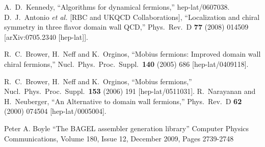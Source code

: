 \documentclass[letter,10pt]{report}
\begin{document}
\begin{thebibliography}{99}
  A.~D.~Kennedy,
  ``Algorithms for dynamical fermions,''
  hep-lat/0607038.
  D.~J.~Antonio {\it et al.}  [RBC and UKQCD Collaborations],
  ``Localization and chiral symmetry in three flavor domain wall QCD,''
  Phys.\ Rev.\ D {\bf 77} (2008) 014509
  [arXiv:0705.2340 [hep-lat]].

  R.~C.~Brower, H.~Neff and K.~Orginos,
  ``Mobius fermions: Improved domain wall chiral fermions,''
  Nucl.\ Phys.\ Proc.\ Suppl.\  {\bf 140} (2005) 686
  [hep-lat/0409118].

  R.~C.~Brower, H.~Neff and K.~Orginos,
  ``Mobius fermions,''
  Nucl.\ Phys.\ Proc.\ Suppl.\  {\bf 153} (2006) 191
  [hep-lat/0511031].
  R.~Narayanan and H.~Neuberger,
  ``An Alternative to domain wall fermions,''
  Phys.\ Rev.\ D {\bf 62} (2000) 074504
  [hep-lat/0005004].

Peter A. Boyle
``The BAGEL assembler generation library''
Computer Physics Communications, Volume 180, Issue 12, December 2009, Pages 2739-2748
\end{thebibliography}
\end{document}
